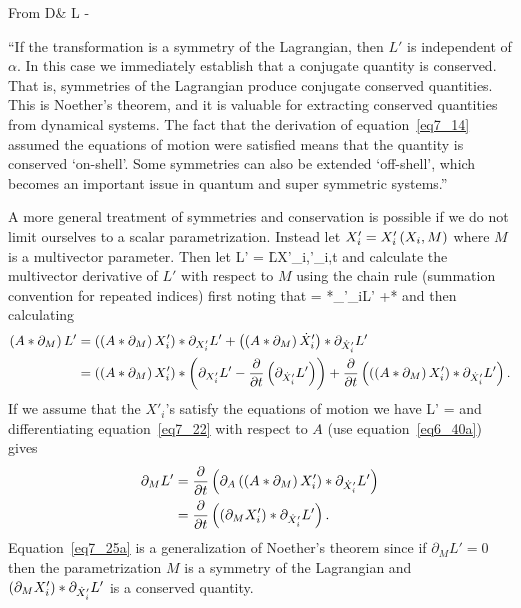 From D\& L -

``If the transformation is a symmetry of the Lagrangian, then $L'$ is independent of $\alpha$.  In this case we immediately establish that a conjugate quantity
is conserved.  That is, symmetries of the Lagrangian produce conjugate conserved quantities.  This is Noether's theorem, and it is valuable for extracting
conserved quantities from dynamical systems.  The fact that the derivation of equation~\ref{eq7_14} assumed the equations of motion were satisfied means that
the quantity is conserved `on-shell'.  Some symmetries can also be extended `off-shell', which becomes an important issue in quantum and super symmetric systems.''

A more general treatment of symmetries and conservation is possible if we do not limit ourselves to a scalar parametrization.  Instead let
$X'_{i} = {X'_{i}}\left ( {X_{i},M} \right )$ where $M$ is a multivector parameter. Then let
\be
	L' = \f{L}{X'_{i},'_{i},t}
\ee
and calculate the multivector derivative of $L'$ with respect to $M$ using the chain rule (summation convention for repeated indices) first noting that
\be
	 = *\partial_{'_{i}}L'
		+*
\ee
and then calculating
\begin{align}
	\left ( {A*\partial_{M}} \right ) L' &= \left ( {\left ( {A*\partial_{M}} \right ) X'_{i}} \right )*\partial_{X'_{i}}L'
	                            +\left ( {\left ( {A*\partial_{M}} \right )\dot{X}'_{i}} \right )*\partial_{\dot{X}'_{i}}L' \nonumber \\
	                       &= \left ( {\left ( {A*\partial_{M}} \right ) X'_{i}} \right )*\left ( {\partial_{X'_{i}}L'-\displaystyle\frac{\partial{}}{\partial{t}}\left ( {\partial_{\dot{X}'_{i}}L'} \right )} \right )
	                          +\displaystyle\frac{\partial{}}{\partial{t}}\left ( {\left ( {\left ( {A*\partial_{M}} \right ) X'_{i}} \right )*\partial_{\dot{X}'_{i}}L'} \right ).
\end{align}
If we assume that the $X'_{i}$'s satisfy the equations of motion we have
\be
	L' = \label{eq7_22}
\ee
and differentiating equation~\ref{eq7_22} with respect to $A$ (use equation~\ref{eq6_40a}) gives
\begin{align}
	\partial_{M}L' &= \displaystyle\frac{\partial{}}{\partial{t}}\left ( {\partial_{A}\left ( {\left ( {A*\partial_{M}} \right ) X'_{i}} \right )*\partial_{\dot{X}'_{i}}L'} \right ) \nonumber \\
	               &= \displaystyle\frac{\partial{}}{\partial{t}}\left ( {\left ( {\partial_{M}X'_{i}} \right )*\partial_{\dot{X}'_{i}}L'} \right ). \label{eq7_25a} 
\end{align}
Equation~\ref{eq7_25a} is a generalization of Noether's theorem since if $\partial_{M}L'= 0$ then the parametrization $M$ is a symmetry of the Lagrangian
and $\left ( {\partial_{M}X'_{i}} \right )*\partial_{\dot{X}'_{i}}L'$ is a conserved quantity.

